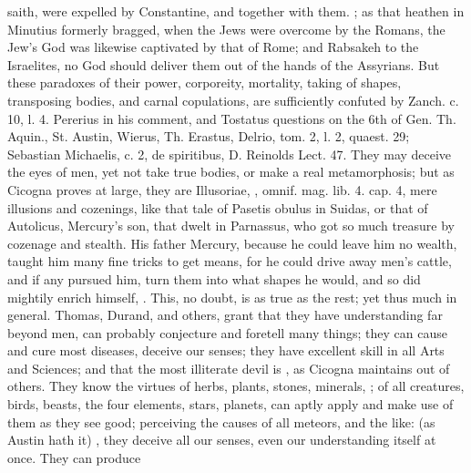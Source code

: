 {{saith, were expelled by Constantine, and together with them. ; as that heathen
in Minutius formerly bragged, when the Jews were overcome by the
Romans, the Jew's God was likewise captivated by that of Rome; and
Rabsakeh to the Israelites, no God should deliver them out of the hands
of the Assyrians. But these paradoxes of their power, corporeity,
mortality, taking of shapes, transposing bodies, and carnal
copulations, are sufficiently confuted by Zanch. c. 10, l. 4. Pererius
in his comment, and Tostatus questions on the 6th of Gen. Th. Aquin.,
St. Austin, Wierus, Th. Erastus, Delrio, tom. 2, l. 2, quaest. 29;
Sebastian Michaelis, c. 2, de spiritibus, D. Reinolds Lect. 47. They
may deceive the eyes of men, yet not take true bodies, or make a real
metamorphosis; but as Cicogna proves at large, they are
Illusoriae, , omnif. mag.
lib. 4. cap. 4, mere illusions and cozenings, like that tale of Pasetis
obulus in Suidas, or that of Autolicus, Mercury's son, that dwelt in
Parnassus, who got so much treasure by cozenage and stealth. His father
Mercury, because he could leave him no wealth, taught him many fine
tricks to get means, for he could drive away men's cattle, and if
any pursued him, turn them into what shapes he would, and so did
mightily enrich himself, . This,
no doubt, is as true as the rest; yet thus much in general. Thomas,
Durand, and others, grant that they have understanding far beyond men,
can probably conjecture and foretell many things; they can cause
and cure most diseases, deceive our senses; they have excellent skill
in all Arts and Sciences; and that the most illiterate devil is , as Cicogna maintains out of others. They know the virtues of herbs, plants, stones, minerals, \etc{}; of all creatures, birds, beasts, the four
elements, stars, planets, can aptly apply and make use of them as they
see good; perceiving the causes of all meteors, and the like:  (as Austin hath it) , they deceive all our
senses, even our understanding itself at once. They can produce
}}
